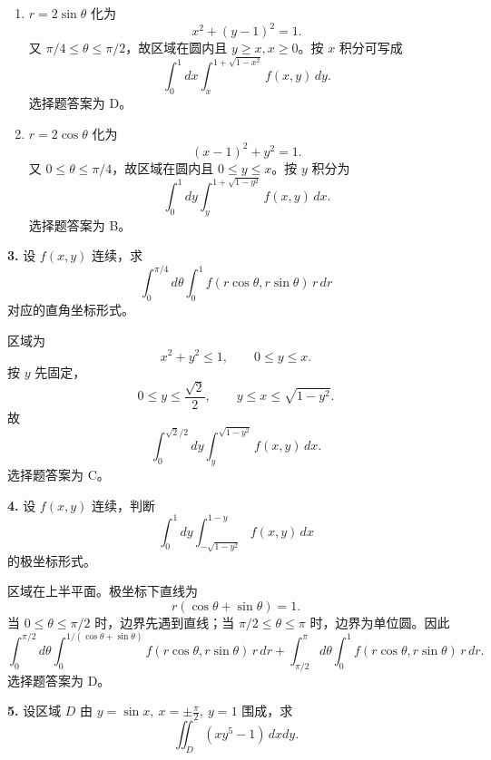 \begin{solutionblock}
\begin{enumerate}
\item \(r=2\sin\theta\) 化为
\[
x^2+(y-1)^2=1.
\]
又 \(\pi/4\le\theta\le\pi/2\)，故区域在圆内且 \(y\ge x,x\ge0\)。按 \(x\) 积分可写成
\[
\boxed{\int_0^1dx\int_x^{1+\sqrt{1-x^2}}f(x,y)\,dy}.
\]
选择题答案为 D。
\item \(r=2\cos\theta\) 化为
\[
(x-1)^2+y^2=1.
\]
又 \(0\le\theta\le\pi/4\)，故区域在圆内且 \(0\le y\le x\)。按 \(y\) 积分为
\[
\boxed{\int_0^1dy\int_y^{1+\sqrt{1-y^2}}f(x,y)\,dx}.
\]
选择题答案为 B。
\end{enumerate}
\end{solutionblock}

\begin{problemblock}
\textbf{3.} 设 \(f(x,y)\) 连续，求
\[
\int_0^{\pi/4}d\theta\int_0^1f(r\cos\theta,r\sin\theta)\,r\,dr
\]
对应的直角坐标形式。
\end{problemblock}

\begin{solutionblock}
区域为
\[
x^2+y^2\le1,\qquad 0\le y\le x.
\]
按 \(y\) 先固定，
\[
0\le y\le\frac{\sqrt2}{2},\qquad y\le x\le\sqrt{1-y^2}.
\]
故
\[
\boxed{\int_0^{\sqrt2/2}dy\int_y^{\sqrt{1-y^2}}f(x,y)\,dx}.
\]
选择题答案为 C。
\end{solutionblock}

\begin{problemblock}
\textbf{4.} 设 \(f(x,y)\) 连续，判断
\[
\int_0^1dy\int_{-\sqrt{1-y^2}}^{1-y}f(x,y)\,dx
\]
的极坐标形式。
\end{problemblock}

\begin{solutionblock}
区域在上半平面。极坐标下直线为
\[
r(\cos\theta+\sin\theta)=1.
\]
当 \(0\le\theta\le\pi/2\) 时，边界先遇到直线；当 \(\pi/2\le\theta\le\pi\) 时，边界为单位圆。因此
\[
\boxed{
\int_0^{\pi/2}d\theta\int_0^{1/(\cos\theta+\sin\theta)}
 f(r\cos\theta,r\sin\theta)\,r\,dr
+\int_{\pi/2}^{\pi}d\theta\int_0^1
 f(r\cos\theta,r\sin\theta)\,r\,dr}.
\]
选择题答案为 D。
\end{solutionblock}

\begin{problemblock}
\textbf{5.} 设区域 \(D\) 由 \(y=\sin x,\ x=\pm\frac{\pi}{2},\ y=1\) 围成，求
\[
\iint_D(xy^5-1)\,dxdy.
\]
\end{problemblock}

